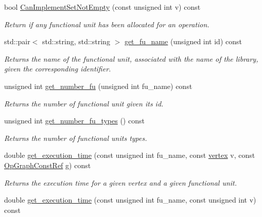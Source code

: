 \begin{DoxyCompactItemize}
\item 
bool \hyperlink{classAllocationInformation_ab2d344c6b8ed05937f994c1bb04d66d4}{Can\+Implement\+Set\+Not\+Empty} (const unsigned int v) const
\begin{DoxyCompactList}\small\item\em Return if any functional unit has been allocated for an operation. \end{DoxyCompactList}\item 
std\+::pair$<$ std\+::string, std\+::string $>$ \hyperlink{classAllocationInformation_a0dcc17e5484d9fad547e371fb2fd26ef}{get\+\_\+fu\+\_\+name} (unsigned int id) const
\begin{DoxyCompactList}\small\item\em Returns the name of the functional unit, associated with the name of the library, given the corresponding identifier. \end{DoxyCompactList}\item 
unsigned int \hyperlink{classAllocationInformation_a2a8c7fa5894b079fb5f2d76bf32fc9ef}{get\+\_\+number\+\_\+fu} (unsigned int fu\+\_\+name) const
\begin{DoxyCompactList}\small\item\em Returns the number of functional unit given its id. \end{DoxyCompactList}\item 
unsigned int \hyperlink{classAllocationInformation_a65af57d814c6e799706348b32abdb05f}{get\+\_\+number\+\_\+fu\+\_\+types} () const
\begin{DoxyCompactList}\small\item\em Returns the number of functional units types. \end{DoxyCompactList}\item 
double \hyperlink{classAllocationInformation_a179bb372b147744dc250c8d310f3e1e8}{get\+\_\+execution\+\_\+time} (const unsigned int fu\+\_\+name, const \hyperlink{graph_8hpp_abefdcf0544e601805af44eca032cca14}{vertex} v, const \hyperlink{op__graph_8hpp_a9a0b240622c47584bee6951a6f5de746}{Op\+Graph\+Const\+Ref} g) const
\begin{DoxyCompactList}\small\item\em Returns the execution time for a given vertex and a given functional unit. \end{DoxyCompactList}\item 
double \hyperlink{classAllocationInformation_aa0baee2e03b9245d2ec159e64fd5b926}{get\+\_\+execution\+\_\+time} (const unsigned int fu\+\_\+name, const unsigned int v) const

\end{DoxyCompactItemize}
